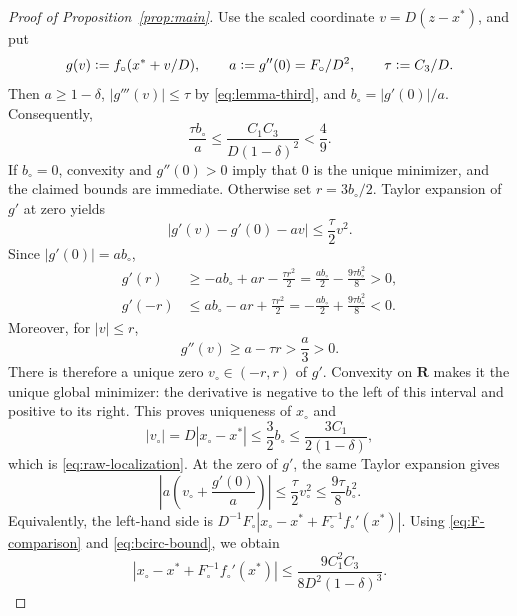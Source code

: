 \documentclass[11pt]{article}
\newcommand{\R}{\mathbf{R}}
\newcommand{\eqdef}{\mathrel{\vcentcolon=}}
\newcommand{\IFP}{F_{\circ}}
\newcommand{\DFN}{D}
\newcommand{\fp}{f_{\circ}}
\newcommand{\xs}{x^{*}}
\newcommand{\xp}{x_{\circ}}
\theoremstyle{definition}
\begin{document}
\begin{proof}[Proof of Proposition~\ref{prop:main}]
Use the scaled coordinate \(v=D(z-x^*)\), and put
\begin{equation}
  g(v)\eqdef f_\circ(x^*+v/D),\qquad
  a\eqdef g''(0)=F_\circ/D^2,\qquad
  \tau\eqdef C_3/D.
  \label{eq:scaled-objective}
\end{equation}
Then \(a\geq1-\delta\), \(|g'''(v)|\leq\tau\) by \eqref{eq:lemma-third}, and
\(b_\circ=|g'(0)|/a\).  Consequently,
\begin{equation}
  \frac{\tau b_\circ}{a}
  \leq\frac{C_1C_3}{D(1-\delta)^2}<\frac49.
  \label{eq:scaled-smallness}
\end{equation}
If \(b_\circ=0\), convexity and \(g''(0)>0\) imply that \(0\) is the unique
minimizer, and the claimed bounds are immediate.  Otherwise set
\(r=3b_\circ/2\).  Taylor expansion of \(g'\) at zero yields
\[
  |g'(v)-g'(0)-av|\leq\frac{\tau}{2}v^2.
\]
Since \(|g'(0)|=ab_\circ\),
\begin{align*}
  g'(r)&\geq-ab_\circ+ar-\frac{\tau r^2}{2}
       =\frac{ab_\circ}{2}-\frac{9\tau b_\circ^2}{8}>0,\\
  g'(-r)&\leq ab_\circ-ar+\frac{\tau r^2}{2}
       =-\frac{ab_\circ}{2}+\frac{9\tau b_\circ^2}{8}<0.
\end{align*}
Moreover, for \(|v|\leq r\),
\[
  g''(v)\geq a-\tau r>\frac a3>0.
\]
There is therefore a unique zero \(v_\circ\in(-r,r)\) of \(g'\).
Convexity on \(\R\) makes it the unique global minimizer: the derivative is
negative to the left of this interval and positive to its right.  This proves
uniqueness of \(\xp\) and
\begin{equation}
  |v_\circ|=D|x_\circ-x^*|\leq\frac32b_\circ
  \leq\frac{3C_1}{2(1-\delta)},
  \label{eq:scalar-localization}
\end{equation}
which is \eqref{eq:raw-localization}.
At the zero of \(g'\), the same Taylor expansion gives
\begin{equation}
  \left|a\left(v_\circ+\frac{g'(0)}a\right)\right|
  \leq\frac{\tau}{2}v_\circ^2
  \leq\frac{9\tau}{8}b_\circ^2.
  \label{eq:scalar-remainder}
\end{equation}
Equivalently, the left-hand side is
\(D^{-1}F_\circ|x_\circ-x^*+F_\circ^{-1}f_\circ'(x^*)|\).
Using \eqref{eq:F-comparison} and \eqref{eq:bcirc-bound}, we obtain
\begin{equation}
  \left|\xp-\xs+\IFP^{-1}\fp'(\xs)\right|
  \leq
  \frac{9C_1^2C_3}{8\DFN^2(1-\delta)^3}.
  \label{eq:Fcirc-remainder}
\end{equation}


\end{proof}
\end{document}
